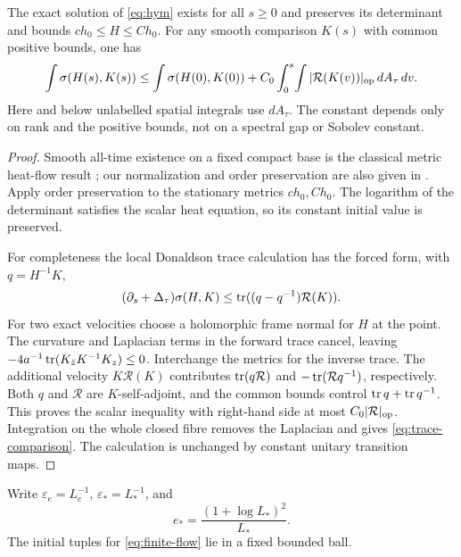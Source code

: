 \begin{lemma}\label{lem:trace-comparison}
The exact solution of \eqref{eq:hym} exists for all
$s\ge0$ and preserves its determinant and bounds
$ch_0\le H\le Ch_0$. For any smooth comparison
$K(s)$ with common positive bounds, one has
\begin{equation}\label{eq:trace-comparison}
 \int\sigma(H(s),K(s))
 \le\int\sigma(H(0),K(0))
       +C_0\int_0^s\!\int|\mathcal R(K(v))|_{\mathrm{op}}\,dA_\tau\,dv .
\end{equation}
Here and below unlabelled spatial integrals use $dA_\tau$.
The constant depends only on rank and the positive
bounds, not on a spectral gap or Sobolev constant.
\end{lemma}
\begin{proof}
Smooth all-time existence on a fixed compact base is
the classical metric heat-flow result
\cite{donaldson}; our normalization and order
preservation are also given in
\cite[Section~4.1 and Proposition~4.3]{hkkp}.
Apply order preservation to the stationary metrics
$ch_0,Ch_0$. The logarithm of the determinant satisfies
the scalar heat equation, so its constant initial
value is preserved.

For completeness the local Donaldson trace calculation
has the forced form, with $q=H^{-1}K$,
\[
 (\partial_s+\Delta_\tau)\sigma(H,K)
 \le\operatorname{tr}((q-q^{-1})\mathcal R(K)).
\]
For two exact velocities choose a holomorphic frame
normal for $H$ at the point. The curvature and
Laplacian terms in the forward trace cancel, leaving
$-4a^{-1}\operatorname{tr}(K_{\bar z}K^{-1}K_z)\le0$.
Interchange the metrics for the inverse trace.
The additional velocity $K\mathcal R(K)$ contributes
$\operatorname{tr}(q\mathcal R)$ and $-\operatorname{tr}(\mathcal Rq^{-1})$,
respectively. Both $q$ and $\mathcal R$ are
$K$-self-adjoint, and the common bounds control
$\operatorname{tr} q+\operatorname{tr} q^{-1}$. This proves the scalar inequality
with right-hand side at most $C_0|\mathcal R|_{\mathrm{op}}$.
Integration on the whole closed fibre removes the
Laplacian and gives \eqref{eq:trace-comparison}.
The calculation is unchanged by constant unitary
transition maps.
\end{proof}

Write $\varepsilon_e=L_e^{-1}$,
$\varepsilon_*=L_*^{-1}$, and
\begin{equation}\label{eq:error-scale}
 e_*=\frac{(1+\log L_*)^2}{L_*}.
\end{equation}
The initial tuples for \eqref{eq:finite-flow} lie in
a fixed bounded ball.

